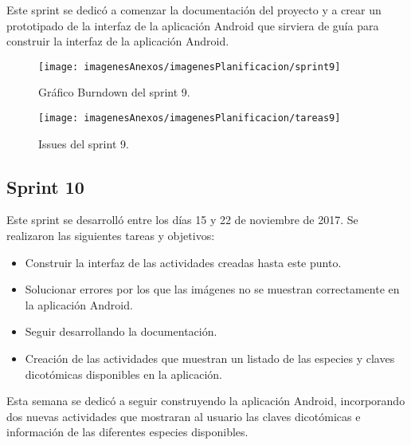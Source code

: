 Este sprint se dedicó a comenzar la documentación del proyecto y a crear un prototipado de la interfaz de la aplicación Android que sirviera de guía para construir la interfaz de la aplicación Android.

\begin{figure}[h]
    \begin{center}%
        \begin{center}%
          \texttt{[image: imagenesAnexos/imagenesPlanificacion/sprint9]}%
          \caption{Gráfico Burndown del sprint 9.}%
          \label{figSprint9}%
        \end{center}%
  	\end{center}%
\end{figure}%

\begin{figure}[h]
    \begin{center}%
        \begin{center}%
          \texttt{[image: imagenesAnexos/imagenesPlanificacion/tareas9]}%
          \caption{Issues del sprint 9.}%
          \label{figTareas9}%
        \end{center}%
  	\end{center}%
\end{figure}%

\newpage

\subsection{Sprint 10}

Este sprint se desarrolló entre los días 15 y 22 de noviembre de 2017. Se realizaron las siguientes tareas y objetivos:

\begin{itemize}
	\item Construir la interfaz de las actividades creadas hasta este punto.
	\item Solucionar errores por los que las imágenes no se muestran correctamente en la aplicación Android.
	\item Seguir desarrollando la documentación.
	\item Creación de las actividades que muestran un listado de las especies y claves dicotómicas disponibles en la aplicación.
\end{itemize}

Esta semana se dedicó a seguir construyendo la aplicación Android, incorporando dos nuevas actividades que mostraran al usuario las claves dicotómicas e información de las diferentes especies disponibles.


